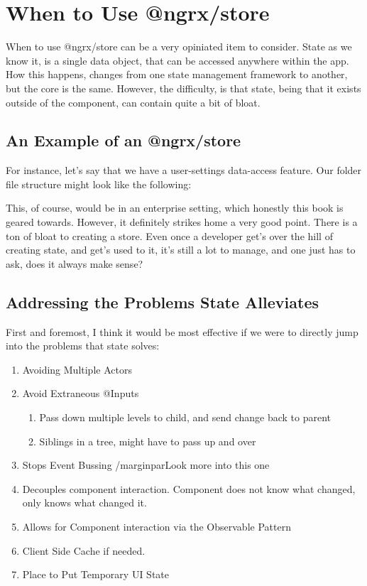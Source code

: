 \section{When to Use @ngrx/store}
When to use @ngrx/store can be a very opiniated item to consider. State as we
know it, is a single data object, that can be accessed anywhere within the app.
How this happens, changes from one state management framework to another, but
the core is the same. However, the difficulty, is that state, being that it
exists outside of the component, can contain quite a bit of bloat.

\subsection{ An Example of an @ngrx/store }

For instance, let's say that we have a user-settings data-access feature. Our
folder file structure might look like the following:



This, of course, would be in an enterprise setting, which honestly this book
is geared towards. However, it definitely strikes home a very good point. There
is a ton of bloat to creating a store. Even once a developer get's over the hill
of creating state, and get's used to it, it's still a lot to manage, and one
just has to ask, does it always make sense?

\subsection{ Addressing the Problems State Alleviates }
First and foremost, I think it would be most effective if we were to directly
jump into the problems that state solves:
\begin{enumerate}
  \item Avoiding Multiple Actors
  \item Avoid Extraneous @Inputs
  \begin{enumerate}
    \item Pass down multiple levels to child, and send change back to parent
    \item Siblings in a tree, might have to pass up and over
  \end{enumerate}
  \item Stops Event Bussing /marginpar{Look more into this one}
  \item Decouples component interaction. Component does not know what changed,
  only knows what changed it.
  \item Allows for Component interaction via the Observable Pattern
  \item Client Side Cache if needed.
  \item Place to Put Temporary UI State
\end{enumerate}


